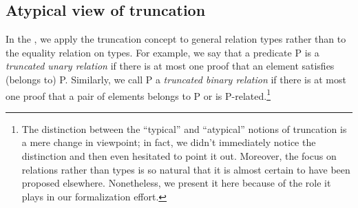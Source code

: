 \documentclass[a4paper,UKenglish,cleveref,autoref,thm-restate,11pt]{lipics-v2021}
\begin{document}
\subsection{Atypical view of truncation}\label{binary-relation-truncation}
In the \agdaualib, we apply the truncation concept to general relation types rather than to the equality relation on types.  For example, we say that a predicate \af P is a \emph{truncated unary relation} if there is at most one proof that an element satisfies (belongs to) \af P.  Similarly, we call \af P a \emph{truncated binary relation} if there is at most one proof that a pair of elements belongs to \af P or is \af P-related.\footnote{The distinction between the ``typical'' and ``atypical'' notions of truncation is a mere change in viewpoint; in fact, we didn't immediately notice the distinction and then even hesitated to point it out.  Moreover, the focus on relations rather than types is so natural that it is almost certain to have been proposed elsewhere. Nonetheless, we present it here because of the role it plays in our formalization effort.}
\end{document}
